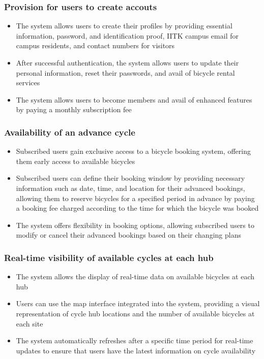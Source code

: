 \documentclass[11pt]{article}
\begin{document}
\subsubsection{Provision for users to create accouts}
\begin{itemize}
    \item The system allows users to create their profiles by providing essential information, password, and identification proof, IITK campus email for campus residents, and contact numbers for visitors
    \item After successful authentication, the system allows users to update their personal information, reset their passwords, and avail of bicycle rental services
    \item The system allows users to become members and avail of enhanced features by paying a monthly subscription fee
\end{itemize}

\subsubsection{Availability of an advance cycle}
\begin{itemize}
    \item Subscribed users gain exclusive access to a bicycle booking system, offering them early access to available bicycles
    \item Subscribed users can define their booking window by providing necessary information such as date, time, and location for their advanced bookings, allowing them to reserve bicycles for a specified period in advance by paying a booking fee charged according to the time for which the bicycle was booked
    \item The system offers flexibility in booking options, allowing subscribed users to modify or cancel their advanced bookings based on their changing plans
\end{itemize}

\subsubsection{Real-time visibility of available cycles at each hub}
\begin{itemize}
    \item The system allows the display of real-time data on available bicycles at each hub
    \item Users can use the map interface integrated into the system, providing a visual representation of cycle hub locations and the number of available bicycles at each site
    \item The system automatically refreshes after a specific time period for real-time updates to ensure that users have the latest information on cycle availability
\end{itemize}
\end{document}
